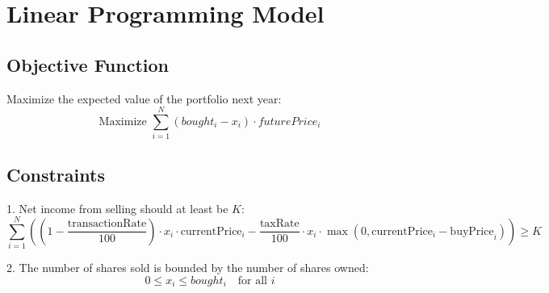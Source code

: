 \documentclass{article}
\begin{document}
\section*{Linear Programming Model}

\subsection*{Objective Function}

Maximize the expected value of the portfolio next year:
\[
\text{Maximize } \sum_{i=1}^{N} (bought_i - x_i) \cdot futurePrice_i
\]

\subsection*{Constraints}

1. Net income from selling should at least be \( K \):
\[
\sum_{i=1}^{N} \left( (1 - \frac{\text{transactionRate}}{100}) \cdot x_i \cdot \text{currentPrice}_i - \frac{\text{taxRate}}{100} \cdot x_i \cdot \max(0, \text{currentPrice}_i - \text{buyPrice}_i) \right) \geq K
\]

2. The number of shares sold is bounded by the number of shares owned:
\[
0 \leq x_i \leq bought_i \quad \text{for all } i
\]
\end{document}
